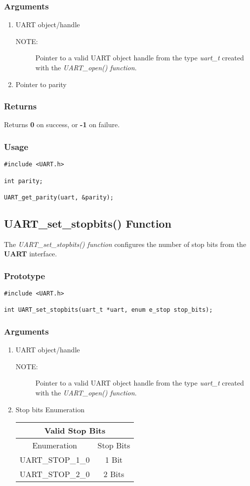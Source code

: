 \documentclass{report}
\begin{document}
\subsubsection*{Arguments}
\begin{enumerate}
\item UART object/handle
\begin{description}
\item[NOTE:] Pointer to a valid UART object handle from the type \textit{uart\_t}
created with the \textit{UART\_open() function}.
\end{description}
\item Pointer to parity
\end{enumerate}
\subsubsection*{Returns}
Returns \textbf{0} on success, or \textbf{-1} on failure.
\subsubsection*{Usage}
\begin{lstlisting}
#include <UART.h>

int parity;

UART_get_parity(uart, &parity);
\end{lstlisting}
\subsection{UART\_set\_stopbits() Function}
The \textit{UART\_set\_stopbits() function} configures the number
of stop bits from the \textbf{UART} interface.
\subsubsection*{Prototype}
\begin{lstlisting}
#include <UART.h>

int UART_set_stopbits(uart_t *uart, enum e_stop stop_bits);
\end{lstlisting}
\subsubsection*{Arguments}
\begin{enumerate}
\item UART object/handle
\begin{description}
\item[NOTE:] Pointer to a valid UART object handle from the type \textit{uart\_t}
created with the \textit{UART\_open() function}.
\end{description}
\item Stop bits Enumeration
\newline
\newline
\begin{tabular}{| c | c |}
\hline
\multicolumn{2}{|c|}{Valid Stop Bits} \\
\hline
Enumeration & Stop Bits \\
\hline
UART\_STOP\_1\_0 & 1 Bit \\
UART\_STOP\_2\_0 & 2 Bits \\
\hline
\end{tabular}
\end{enumerate}
\end{document}
